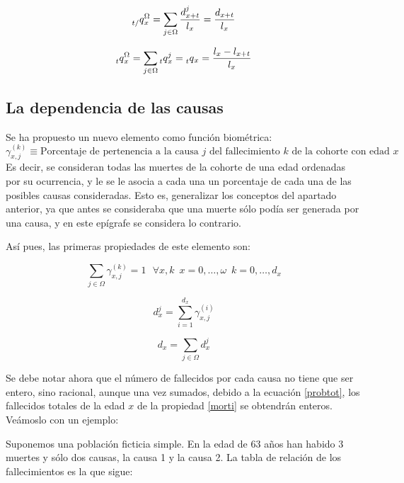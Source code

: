 \documentclass{article}
\begin{document}
$$
\prescript{}{t/}q_{x}^{\Omega}=\sum_{j\in\Omega}\frac{d_{x+t}^{j}}{l_{x}}=\frac{d_{x+t}}{l_{x}}
$$

\begin{equation}
\prescript{}{t}q_{x}^{\Omega}=\sum_{j\in\Omega}\prescript{}{t}q_{x}^{j}=\prescript{}{t}q_{x}=\frac{l_{x}-l_{x+t}}{l_{x}}
\label{equivcaus}
\end{equation}


\subsection{La dependencia de las causas}

Se ha propuesto un nuevo elemento como función biométrica:
$$
\gamma_{x,j}^{(k)}\equiv \text{Porcentaje de pertenencia a la causa $j$ del fallecimiento $k$ de la cohorte con  edad $x$}
$$
Es decir, se consideran todas las muertes de la cohorte de una edad ordenadas por su ocurrencia, y le se le asocia a cada una un porcentaje  de cada una de las posibles causas consideradas. Esto es, generalizar los conceptos del apartado anterior, ya que antes se consideraba que una muerte sólo podía ser generada por una causa, y en este epígrafe se considera lo contrario.

Así pues, las primeras propiedades de este elemento son:

\begin{equation}
\label{probtot}
\sum_{j\in\Omega}\gamma_{x,j}^{(k)}=1 \,\,\,\,\forall x,k\,\,\,x=0,\dots,\omega\,\,\,k=0,\dots,d_{x}
\end{equation}

\begin{equation}
\label{mortcaus}
d_{x}^{j}=\sum_{i=1}^{d_{x}}\gamma_{x,j}^{(i)}
\end{equation}

\begin{equation}
\label{morti}
d_{x}=\sum_{j\in\Omega}d_{x}^{j}
\end{equation}



Se debe notar ahora que el número de fallecidos por cada causa no tiene que ser entero, sino racional, aunque una vez sumados, debido a la ecuación \ref{probtot}, los fallecidos totales de la edad $x$ de la propiedad \ref{morti} se obtendrán enteros. Veámoslo con un ejemplo:
\vspace{0.3cm}

Suponemos una población ficticia simple. En la edad de 63 años han habido 3 muertes y sólo dos causas, la causa 1 y la causa 2. La tabla de relación de los fallecimientos es la que sigue:
\end{document}
